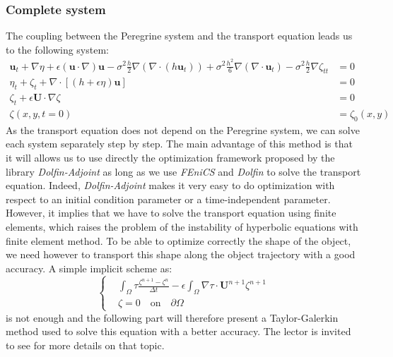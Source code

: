 \documentclass[11pt,a4paper]{article}
\begin{document}
\subsubsection{Complete system}
	The coupling between the Peregrine system and the transport equation leads us to the following system:
	\begin{align}
		\mathbf{u}_t + \nabla \eta + \epsilon (\mathbf{u} \cdot \nabla)\mathbf{u} - \sigma^2\frac{h}{2}\nabla (\nabla \cdot (h \mathbf{u}_t)) + \sigma^2 \frac{h^2}{6}\nabla (\nabla \cdot \mathbf{u}_t) - \sigma^2\frac{h}{2}\nabla \zeta_{tt}  &= 0\\
		\eta_t+\zeta_t + \nabla \cdot [(h+\epsilon\eta)\mathbf{u}] &= 0 \\
		\zeta_t + \epsilon \mathbf{U} \cdot \nabla \zeta &= 0\\
		\zeta(x,y,t=0) &= \zeta_0(x,y)
	\end{align}
	As the transport equation does not depend on the Peregrine system, we can solve each system separately step by step. The main advantage of this method is that it will allows us to use directly the optimization framework proposed by the library \textit{Dolfin-Adjoint} as long as we use \textit{FEniCS} and \textit{Dolfin}  to solve the transport equation. Indeed, \textit{Dolfin-Adjoint} makes it very easy to do optimization with respect to an initial condition parameter or a time-independent parameter. However, it implies that we have to solve the transport equation using finite elements, which raises the problem of the instability of hyperbolic equations with finite element method. To be able to optimize correctly the shape of the object, we need however to transport this shape along the object trajectory with a good accuracy. A simple implicit scheme as:
	\begin{equation}\label{TransportSimple}
	\left\lbrace
	\begin{split}
		&\int_{\Omega}{\! \tau \frac{\zeta^{n+1} - \zeta^n}{\Delta t}}  -   \epsilon \int_{\Omega}{\! \nabla \tau \cdot  \mathbf{U}^{n+1}  \zeta^{n+1}}\\
		&\zeta = 0 \quad \mathrm{on} \quad \partial \Omega
		\end{split}
		\right.
	\end{equation} 
	is not enough and the following part will therefore present a Taylor-Galerkin method used to solve this equation with a better accuracy. The lector is invited to see \cite{Transport} for more details on that topic. 
				
\end{document}
